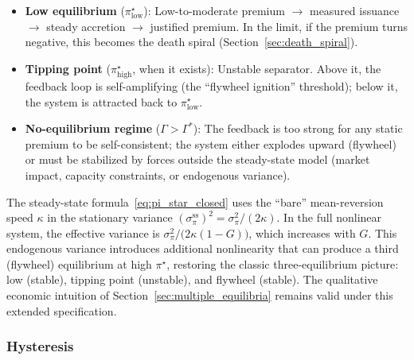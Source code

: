\begin{remark}
  \label{rem:three_equil_econ}
  \leavevmode
  \begin{itemize}
    \item \textbf{Low equilibrium} ($\pi^\star_{\mathrm{low}}$):
      Low-to-moderate premium $\to$ measured issuance $\to$ steady accretion
      $\to$ justified premium.  In the limit, if the premium turns negative,
      this becomes the death spiral (Section~\ref{sec:death_spiral}).
    \item \textbf{Tipping point} ($\pi^\star_{\mathrm{high}}$, when it
      exists): Unstable separator.  Above it, the feedback loop is
      self-amplifying (the ``flywheel ignition'' threshold); below it, the
      system is attracted back to $\pi^\star_{\mathrm{low}}$.
    \item \textbf{No-equilibrium regime} ($\Gamma > \Gamma^*$):
      The feedback is too strong for any static premium to be self-consistent;
      the system either explodes upward (flywheel) or must be stabilized by
      forces outside the steady-state model (market impact, capacity
      constraints, or endogenous variance).
  \end{itemize}
\end{remark}

\begin{remark}
  \label{rem:three_equil_endo}
  The steady-state formula~\eqref{eq:pi_star_closed} uses the ``bare''
  mean-reversion speed $\kappa$ in the stationary variance
  $(\sigma_\pi^{\mathrm{ss}})^2 = \sigma_\pi^2/(2\kappa)$.
  In the full nonlinear system, the effective variance is
  $\sigma_\pi^2/\bigl(2\kappa(1-G)\bigr)$, which increases with $G$.
  This endogenous variance introduces additional nonlinearity that can
  produce a third (flywheel) equilibrium at high $\pi^\star$, restoring
  the classic three-equilibrium picture: low (stable), tipping point
  (unstable), and flywheel (stable).  The qualitative economic intuition
  of Section~\ref{sec:multiple_equilibria} remains valid under this
  extended specification.
\end{remark}

\subsubsection{Hysteresis}
\label{sec:hysteresis}

